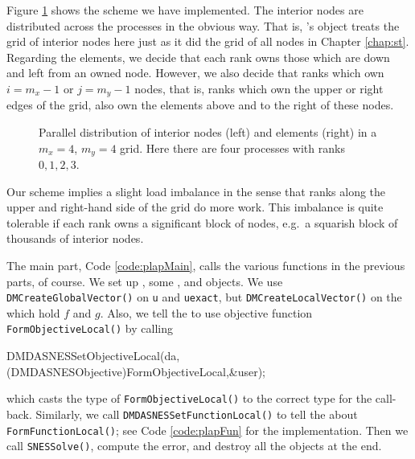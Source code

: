 
Figure \ref{fig:of:parallelgrid} shows the scheme we have implemented.  The interior nodes are distributed across the processes in the obvious way.  That is, \PETSc's \pDMDA object treats the grid of interior nodes here just as it did the grid of all nodes in Chapter \ref{chap:st}.  Regarding the elements, we decide that each rank owns those which are down and left from an owned node.  However, we also decide that ranks which own $i=m_x-1$ or $j=m_y-1$ nodes, that is, ranks which own the upper or right edges of the grid, also own the elements above and to the right of these nodes.

\begin{figure}

\caption{Parallel distribution of interior nodes (left) and elements (right) in a $m_x=4$, $m_y=4$ grid.  Here there are four processes with ranks $0,1,2,3$.}
\label{fig:of:parallelgrid}
\end{figure}

Our scheme implies a slight load imbalance in the sense that ranks along the upper and right-hand side of the grid do more work.  This imbalance is quite tolerable if each rank owns a significant block of nodes, e.g.~a squarish block of thousands of interior nodes.

The main part, Code \ref{code:plapMain}, calls the various functions in the previous parts, of course.  We set up \pDMDA, some \pVecs, and \pSNES objects.  We use \texttt{DMCreateGlobalVector()} on \texttt{u} and \texttt{uexact}, but \texttt{DMCreateLocalVector()} on the \pVecs which hold $f$ and $g$.  Also, we tell the \pSNES to use objective function \texttt{FormObjectiveLocal()} by calling
\begin{code}
    DMDASNESSetObjectiveLocal(da,(DMDASNESObjective)FormObjectiveLocal,&user);
\end{code}
which casts the type of \texttt{FormObjectiveLocal()} to the correct type for the call-back.  Similarly, we call \texttt{DMDASNESSetFunctionLocal()} to tell the \pDMDA about \texttt{FormFunctionLocal()}; see Code \ref{code:plapFun} for the implementation.  Then we call \texttt{SNESSolve()}, compute the error, and destroy all the objects at the end.

